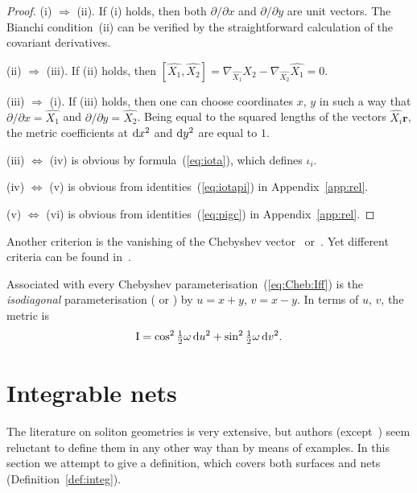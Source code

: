 \documentclass[pdftex]{sigma}
\let\ve\mathbf
\def\eqref#1{{\rm(\ref{#1})}}
\numberwithin{equation}{section}
\def\dif{\mathop{}\!\mathrm d}
\begin{document}
\begin{proof}
(i) $\Rightarrow$ (ii).
If (i) holds, then both $\partial/\partial x$ and $\partial/\partial y$ are unit
vectors.
The Bianchi condition~(ii) can be verified by the straightforward calculation
of the covariant derivatives.

(ii) $\Rightarrow$ (iii).
If (ii) holds, then $[\widehat{X_1}, \widehat{X_2}]
 = \nabla_{\widehat{X_1}} \widehat{X_2} - \nabla_{\widehat{X_2}} \widehat{X_1} = 0$.

(iii) $\Rightarrow$ (i).
If (iii) holds, then one can choose coordinates $x$, $y$ in such a way that
$\partial/\partial x = \widehat{X_1}$ and $\partial/\partial y = \widehat{X_2}$.
Being equal to the squared lengths of the vectors $\widehat{X_i} \ve r$,
the metric coefficients at ${\rm d} x^2$ and ${\rm d} y^2$ are equal to $1$.

(iii) $\Leftrightarrow$ (iv) is obvious by formula~\eqref{eq:iota},
which defines $\iota_i$.

(iv) $\Leftrightarrow$ (v) is obvious from identities~\eqref{eq:iotapi} in
Appendix~\ref{app:rel}.

(v) $\Leftrightarrow$ (vi) is obvious from identities~\eqref{eq:pigc} in
Appendix~\ref{app:rel}.
\end{proof}

\begin{Remark}Another criterion is the vanishing of the Chebyshev vector~\cite[Section~67]{APN}
or~\cite[Section~55]{VIS}.
Yet different criteria can be found in~\cite{WCG-1932,SF-C-BC-V,WKS-2007,CEW}.
\end{Remark}


\begin{Remark}\label{rem:bisect}
Associated with every Chebyshev parameterisation~\eqref{eq:Cheb:Iff} is the
{\it isodiagonal} parameterisation
(\cite[Section~1]{AV-1869} or \hbox{\cite[Section~678]{GD-III}}) by
$u = x + y$, $v = x - y$.
In terms of $u$, $v$, the metric is
\[%
{\rm I} = \cos^2 \tfrac12 \omega \dif u^2 + \sin^2 \tfrac12 \omega \dif v^2.
\]
\end{Remark}

\section{Integrable nets}\label{sect:integrability}

The literature on soliton geometries is very extensive,
but authors (except~\cite{Sym}) seem reluctant to define them in any other way
than by means of examples.
In this section we attempt to give a definition, which covers both surfaces and nets
(Definition~\ref{def:integ}).
\end{document}
